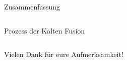 \begin{frame}{Zusammenfassung}
\begin{columns}
\begin{column}{0.35\textwidth}
\begin{center}
            {\scriptsize Prozess der Kalten Fusion}
            \end{center}
        \end{column}
    \end{columns}
    
    \vfill
    
    \begin{center}
    Vielen Dank für eure Aufmerksamkeit!
    \end{center}
    
    \vfill
\end{frame}